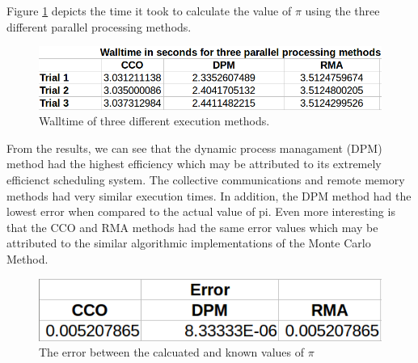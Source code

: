 Figure \ref{fig:Results} depicts the time it took to calculate the value of $\pi$ using the three different parallel processing methods. 

\begin{figure}
\centering
\includegraphics[scale=0.4]{Figures/walltime}
\decoRule
\caption[Results]{Walltime of three different execution methods.}
\label{fig:Results}
\end{figure} 

From the results, we can see that the dynamic process managament (DPM) method had the highest efficiency which may be attributed to its extremely efficienct scheduling system. The collective communications and remote memory methods had very similar execution times. In addition, the DPM method had the lowest error when compared to the actual value of pi. Even more interesting is that the CCO and RMA methods had the same error values which may be attributed to the similar algorithmic implementations of the Monte Carlo Method. 


\begin{figure}
\centering
\includegraphics[scale=0.4]{Figures/error}
\decoRule
\caption[Error]{The error between the calcuated and known values of $\pi$}
\label{fig:Error}
\end{figure}
